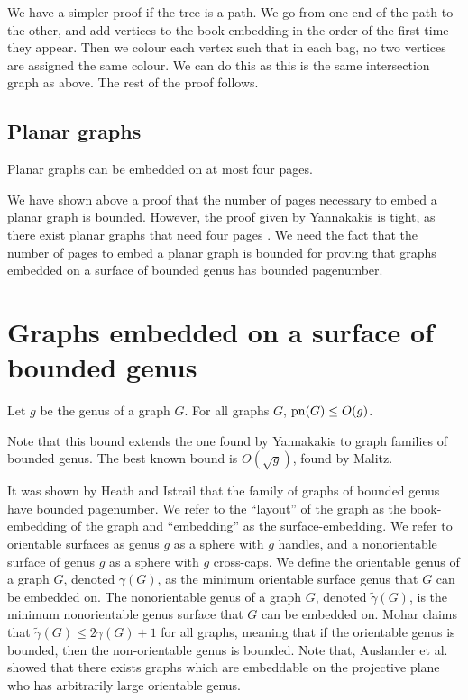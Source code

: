 We have a simpler proof if the tree is a path. We go from one end of the path to the other, and add vertices to the book-embedding in the order of the first time they appear. Then we colour each vertex such that in each bag, no two vertices are assigned the same colour. We can do this as this is the same intersection graph as above. The rest of the proof follows.

\subsection{Planar graphs}\label{ssec:Planar_Graphs}
\begin{theorem}\label{thm:4Pages_Planar}
	Planar graphs can be embedded on at most four pages.
\end{theorem}
We have shown above a proof that the number of pages necessary to embed a planar graph is bounded. However, the proof given by Yannakakis is tight, as there exist planar graphs that need four pages \cite{yannakakisPlanarGraphsThat2020} \cite{kaufmannFourPagesAre2020}. We need the fact that the number of pages to embed a planar graph is bounded for proving that graphs embedded on a surface of bounded genus has bounded pagenumber.

\section{Graphs embedded on a surface of bounded genus}\label{sec:pagenumber_bounded_genus}

\begin{theorem}\label{thm:Genus_pagenumber_bound}
	Let \(g\) be the genus of a graph \(G\). For all graphs \(G\), \(\operatorname{pn}(G) \leq O(g)\).
\end{theorem}
Note that this bound extends the one found by Yannakakis \cite{yannakakisEmbeddingPlanarGraphs1989} to graph families of bounded genus.
The best known bound is \(O(\sqrt{g})\), found by Malitz\cite{malitzGenusGraphsHave1994}.

It was shown by Heath and Istrail that the family of graphs of bounded genus have bounded pagenumber.
We refer to the ``layout'' of the graph as the book-embedding of the graph and ``embedding'' as the surface-embedding. We refer to orientable surfaces as genus \(g\) as a sphere with \(g\) handles, and a nonorientable surface of genus \(g\) as a sphere with \(g\) cross-caps. We define the orientable genus of a graph \(G\), denoted \(\gamma(G)\), as the minimum orientable surface genus that \(G\) can be embedded on. The nonorientable genus of a graph \(G\), denoted \(\tilde{\gamma}(G)\), is the minimum nonorientable genus surface that \(G\) can be embedded on. Mohar\cite{moharOrientableGenusGraphs1998} claims that \(\tilde{\gamma}(G) \leq 2 \gamma(G) + 1\) for all graphs, meaning that if the orientable genus is bounded, then the non-orientable genus is bounded. Note that, Auslander et al.\cite{auslanderImbeddingGraphsManifolds1963} showed that there exists graphs which are embeddable on the projective plane who has arbitrarily large orientable genus.
